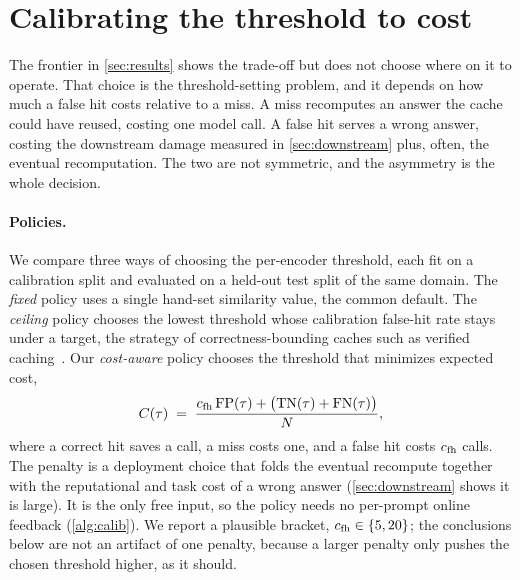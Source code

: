 \section{Calibrating the threshold to cost}
\label{sec:calibration}

The frontier in \cref{sec:results} shows the trade-off but does not choose where on it to
operate. That choice is the threshold-setting problem, and it depends on how much a false hit
costs relative to a miss. A miss recomputes an answer the cache could have reused,
costing one model call. A false hit serves a wrong answer, costing the downstream damage
measured in \cref{sec:downstream} plus, often, the eventual recomputation. The two are not
symmetric, and the asymmetry is the whole decision.

\paragraph{Policies.}
We compare three ways of choosing the per-encoder threshold, each fit on a calibration split
and evaluated on a held-out test split of the same domain. The \emph{fixed} policy uses a
single hand-set similarity value, the common default. The \emph{ceiling} policy chooses the
lowest threshold whose calibration false-hit rate stays under a target, the strategy of
correctness-bounding caches such as verified caching~\cite{schroeder2025vcache}. Our
\emph{cost-aware} policy chooses the threshold that minimizes expected cost,
\begin{equation}
  C(\tau) \;=\; \frac{c_{\mathrm{fh}}\,\mathrm{FP}(\tau) + \big(\mathrm{TN}(\tau)+\mathrm{FN}(\tau)\big)}{N},
  \label{eq:cost}
\end{equation}
where a correct hit saves a call, a miss costs one, and a false hit costs $c_{\mathrm{fh}}$
calls. The penalty is a deployment choice that folds the eventual recompute together with the
reputational and task cost of a wrong answer (\cref{sec:downstream} shows it is large). It is
the only free input, so the policy needs no per-prompt online feedback (\cref{alg:calib}). We
report a plausible bracket, $c_{\mathrm{fh}} \in \{5, 20\}$; the conclusions below are not an artifact of
one penalty, because a larger penalty only pushes the chosen threshold higher, as it should.

